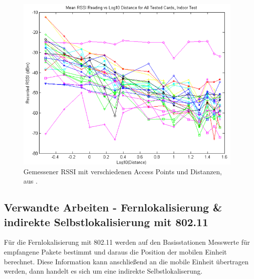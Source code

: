 \begin{figure}[h]
  \centering
	\includegraphics[width=\textwidth]{images/luiRSSI.png}
  \caption{Gemessener RSSI mit verschiedenen Access Points und Distanzen, aus \cite{lui2011differences}.}
  \label{fig:luiRSSI}
\end{figure}




\subsection{Verwandte Arbeiten - Fernlokalisierung \& indirekte Selbstlokalisierung mit 802.11}
Für die Fernlokalisierung mit 802.11 werden auf den Basisstationen Messwerte für empfangene Pakete bestimmt und daraus die Position der mobilen Einheit berechnet.
Diese Information kann anschließend an die mobile Einheit übertragen werden, dann handelt es sich um eine indirekte Selbstlokaliserung.

